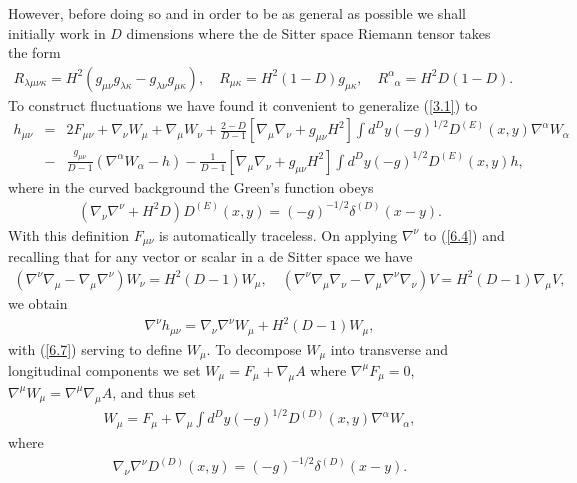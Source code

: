 \documentclass[aps,onecolumn,10pt]{revtex4}
\numberwithin{equation}{section}
\numberwithin{equation}{section}
\begin{document}
However, before doing so and in order to be as general as possible we shall initially work in $D$ dimensions where the de Sitter space Riemann tensor takes the form
%
\begin{eqnarray}
R_{\lambda\mu\nu\kappa}=H^2(g_{\mu\nu}g_{\lambda\kappa}-g_{\lambda\nu}g_{\mu\kappa}),
\quad R_{\mu\kappa}=H^2(1-D)g_{\mu\kappa},\quad R^{\alpha}_{\phantom{\alpha}\alpha}=H^2D(1-D).
\label{6.3}
\end{eqnarray}
% 
To construct fluctuations we have found it convenient to generalize (\ref{3.1}) to 
%
\begin{eqnarray}
h_{\mu\nu}&=&2F_{\mu\nu}+\nabla_{\nu}W_{\mu}+\nabla_{\mu}W_{\nu}+\frac{2-D}{D-1}\left[\nabla_{\mu}\nabla_{\nu}
+g_{\mu\nu}H^2\right]\int d^Dy(-g)^{1/2}D^{(E)}(x,y)\nabla^{\alpha}W_{\alpha}
\nonumber\\
&-&\frac{g_{\mu\nu}}{D-1}(\nabla^{\alpha}W_{\alpha}-h)-\frac{1}{D-1}\left[\nabla_{\mu}\nabla_{\nu}+g_{\mu\nu}H^2\right]\int d^Dy(-g)^{1/2}D^{(E)}(x,y)h,
\label{6.4}
\end{eqnarray}
%
where in the curved background the Green's function obeys
%
\begin{eqnarray}
\left(\nabla_{\nu}\nabla^{\nu}+H^2D\right)D^{(E)}(x,y)=(-g)^{-1/2}\delta^{(D)}(x-y).
\label{6.5}
\end{eqnarray}
%
With this definition $F_{\mu\nu}$ is automatically traceless. On applying $\nabla^{\nu}$ to (\ref{6.4}) and recalling that for any vector or scalar in a de Sitter space  we have
%
\begin{eqnarray}
(\nabla^{\nu}\nabla_{\mu}-\nabla_{\mu}\nabla^{\nu})W_{\nu}=H^2(D-1)W_{\mu},\quad 
(\nabla^{\nu}\nabla_{\mu}\nabla_{\nu}-\nabla_{\mu}\nabla^{\nu}\nabla_{\nu})V=H^2(D-1)\nabla_{\mu}V,
\label{6.6}
\end{eqnarray}
%
we obtain
%
\begin{eqnarray}
\nabla^{\nu}h_{\mu\nu}=\nabla_{\nu}\nabla^{\nu}W_{\mu}+H^2(D-1)W_{\mu},
\label{6.7}
\end{eqnarray}
%
with (\ref{6.7}) serving to define $W_{\mu}$. To decompose $W_{\mu}$ into transverse and longitudinal components we set $W_{\mu}=F_{\mu}+\nabla_{\mu}A$ where $\nabla^{\mu}F_{\mu}=0$, $\nabla^{\mu}W_{\mu}=\nabla^{\mu}\nabla_{\mu}A$, and thus set
%
\begin{eqnarray}
W_{\mu}=F_{\mu}+\nabla_{\mu}\int d^Dy(-g)^{1/2}D^{(D)}(x,y)\nabla^{\alpha}W_{\alpha},
\label{6.8}
\end{eqnarray}
%
where
%
\begin{eqnarray}
\nabla_{\nu}\nabla^{\nu}D^{(D)}(x,y)=(-g)^{-1/2}\delta^{(D)}(x-y).
\label{6.9}
\end{eqnarray}
\end{document}
